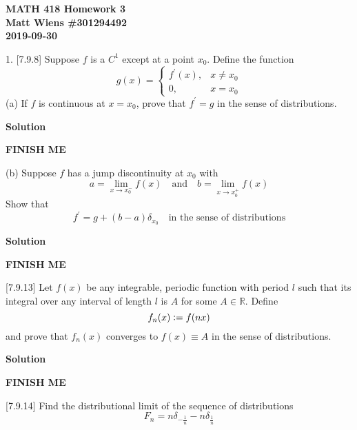 \documentclass{article}
\begin{document}
\textbf{MATH 418 Homework 3} \\
\textbf{Matt Wiens \#301294492} \\
\textbf{2019-09-30}

1. [7.9.8] Suppose $f$ is a $C^{1}$ except at a point $x_{0}$. Define
the function
%
\begin{equation*}
    g(x) =
        \begin{cases}
            f^{\prime}(x), & x \neq x_0 \\
            0, & x=x_0
        \end{cases}
\end{equation*}
%
(a) If $f$ is continuous at $x=x_0$, prove that $f^{\prime} = g$ in the
sense of distributions.

\textbf{Solution}

\textbf{FINISH ME}

\vspace{5mm}

(b) Suppose $f$ has a jump discontinuity at $x_0$ with
%
\begin{equation*}
    a = \lim_{x \rightarrow x_0^-} f(x)
        \quad \text {and} \quad
    b = \lim_{x \rightarrow x_0^+} f(x)
\end{equation*}
%
Show that
%
\begin{equation*}
    f^{\prime} =g + (b - a) \delta_{x_0} \quad \text {in the sense of distributions}
\end{equation*}

\textbf{Solution}

\textbf{FINISH ME}

\vspace{5mm}

[7.9.13] Let $f(x)$ be any integrable, periodic function with period $l$
such that its integral over any interval of length $l$ is $A$ for some
$A \in \mathbb{R}$. Define
%
\begin{equation*}
    f_n(x) \vcentcolon= f(n x)
\end{equation*}
%
and prove that $f_n(x)$ converges to $f(x) \equiv A$ in the sense of
distributions.

\textbf{Solution}

\textbf{FINISH ME}

\vspace{5mm}

[7.9.14] Find the distributional limit of the sequence of distributions
%
\begin{equation*}
    F_n = n \delta_{- \frac{1}{n}} - n \delta_{\frac{1}{n}}
\end{equation*}
\end{document}
